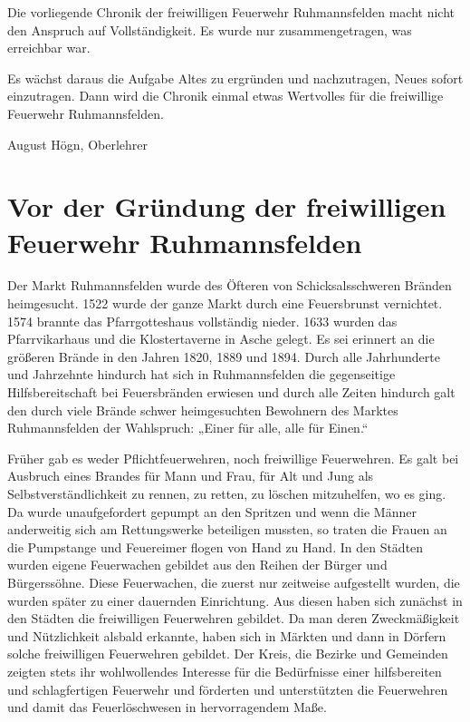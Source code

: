 \documentclass[12pt,a4paper]{book}
\begin{document}
Die vorliegende Chronik der freiwilligen Feuerwehr Ruhmannsfelden macht nicht
den Anspruch auf Vollständigkeit. Es wurde nur zusammengetragen, was erreichbar
war.

Es wächst daraus die Aufgabe Altes zu ergründen und nachzutragen, Neues sofort
einzutragen. Dann wird die Chronik einmal etwas Wertvolles für die freiwillige
Feuerwehr Ruhmannsfelden.

August Högn, Oberlehrer

\chapter{Vor der Gründung der freiwilligen Feuerwehr Ruhmannsfelden}

Der Markt Ruhmannsfelden wurde des Öfteren von Schicksalsschweren Bränden
heimgesucht. 1522 wurde der ganze Markt durch eine Feuersbrunst vernichtet. 1574
brannte das Pfarrgotteshaus vollständig nieder. 1633 wurden das Pfarrvikarhaus
und die Klostertaverne in Asche gelegt. Es sei erinnert an die größeren Brände
in den Jahren 1820, 1889 und 1894. Durch alle Jahrhunderte und Jahrzehnte
hindurch hat sich in Ruhmannsfelden die gegenseitige Hilfsbereitschaft bei
Feuersbränden erwiesen und durch alle Zeiten hindurch galt den durch viele
Brände schwer heimgesuchten Bewohnern des Marktes Ruhmannsfelden der Wahlspruch:
„Einer für alle, alle für Einen.“

Früher gab es weder Pflichtfeuerwehren, noch freiwillige Feuerwehren. Es galt
bei Ausbruch eines Brandes für Mann und Frau, für Alt und Jung als
Selbstverständlichkeit zu rennen, zu retten, zu löschen mitzuhelfen, wo es ging.
Da wurde unaufgefordert gepumpt an den Spritzen und wenn die Männer anderweitig
sich am Rettungswerke beteiligen mussten, so traten die Frauen an die Pumpstange
und Feuereimer flogen von Hand zu Hand. In den Städten wurden eigene Feuerwachen
gebildet aus den Reihen der Bürger und Bürgerssöhne. Diese Feuerwachen, die
zuerst nur zeitweise aufgestellt wurden, die wurden später zu einer dauernden
Einrichtung. Aus diesen haben sich zunächst in den Städten die freiwilligen
Feuerwehren gebildet. Da man deren Zweckmäßigkeit und Nützlichkeit alsbald
erkannte, haben sich in Märkten und dann in Dörfern solche freiwilligen
Feuerwehren gebildet. Der Kreis, die Bezirke und Gemeinden zeigten stets ihr
wohlwollendes Interesse für die Bedürfnisse einer hilfsbereiten und
schlagfertigen Feuerwehr und förderten und unterstützten die Feuerwehren und
damit das Feuerlöschwesen in hervorragendem Maße.
\end{document}
